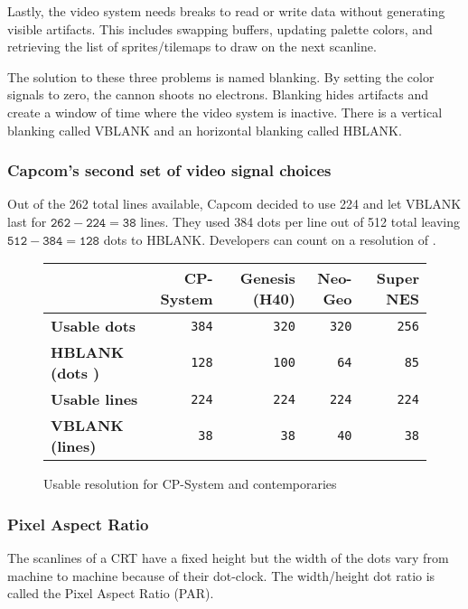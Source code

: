 Lastly, the video system needs breaks to read or write data without generating visible artifacts. This includes swapping buffers, updating palette colors, and retrieving the list of sprites/tilemaps to draw on the next scanline.

The solution to these three problems is named blanking. By setting the color signals to zero, the cannon shoots no electrons. Blanking hides artifacts and create a window of time where the video system is inactive. There is a vertical blanking called VBLANK and an horizontal blanking called HBLANK.


\subsubsection{Capcom's second set of video signal choices}

Out of the 262 total lines available, Capcom decided to use 224 and let VBLANK last for $\mathtt{262 - 224 = 38}$ lines. They used 384 dots per line out of 512 total leaving $\mathtt{512 - 384 = 128}$ dots to HBLANK. Developers can count on a resolution of .

\begin{figure}[H]
{ \setlength{\tabcolsep}{3.0pt}
\begin{tabularx}{\textwidth}{Xrrrr} 
  \textbf{ } & \textbf{CP-System} & \textbf{Genesis (H40)} & \textbf{Neo-Geo} & \textbf{Super NES} \\
  \toprule    
   \textbf{Usable dots} & \texttt{384}  & \texttt{320} & \texttt{320} & \texttt{256} \\
   \textbf{HBLANK (dots )} & \texttt{128}  & \texttt{100} & \texttt{64} & \texttt{85}  \\
   \textbf{Usable lines} & \texttt{224} & \texttt{224} & \texttt{224} & \texttt{224} \\
   \textbf{VBLANK (lines)} & \texttt{38}  & \texttt{38} & \texttt{40} & \texttt{38}  \\
\toprule    

\end{tabularx}%
}\caption*{Usable resolution for CP-System and contemporaries}
\end{figure}

\pagebreak


\subsubsection{Pixel Aspect Ratio}

The scanlines of a CRT have a fixed height but the width of the dots vary from machine to machine because of their dot-clock. The width/height dot ratio is called the Pixel Aspect Ratio (PAR).

